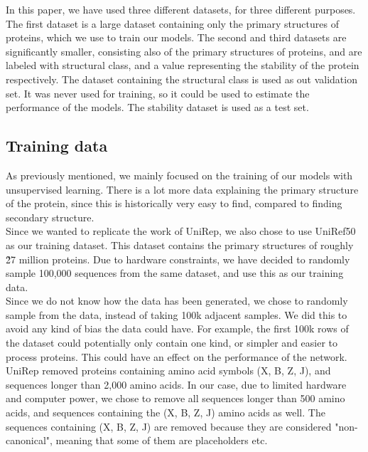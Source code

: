 In this paper, we have used three different datasets, for three different purposes. The first dataset is a large dataset containing only the primary structures of proteins, which we use to train our models. The second and third datasets are significantly smaller, consisting also of the primary structures of proteins, and are labeled with structural class, and a value representing the stability of the protein respectively. The dataset containing the structural class is used as out validation set. It was never used for training, so it could be used to estimate the performance of the models. The stability dataset is used as a test set.

\subsection{Training data}
As previously mentioned, we mainly focused on the training of our models with unsupervised learning. There is a lot more data explaining the primary structure of the protein, since this is historically very easy to find, compared to finding secondary structure. \\

\noindent
Since we wanted to replicate the work of UniRep, we also chose to use UniRef50 as our training dataset.\cite{uniref} This dataset contains the primary structures of roughly \~ 27 million proteins. Due to hardware constraints, we have decided to randomly sample 100,000 sequences from the same dataset, and use this as our training data. \\
Since we do not know how the data has been generated, we chose to randomly sample from the data, instead of taking 100k adjacent samples. We did this to avoid any kind of bias the data could have. For example, the first 100k rows of the dataset could potentially only contain one kind, or simpler and easier to process proteins. This could have an effect on the performance of the network.\\

\noindent
UniRep removed proteins containing amino acid symbols (X, B, Z, J), and sequences longer than 2,000 amino acids.\cite{unirep} In our case, due to limited hardware and computer power, we chose to remove all sequences longer than 500 amino acids, and sequences containing the (X, B, Z, J) amino acids as well. The sequences containing (X, B, Z, J) are removed because they are considered "non-canonical", meaning that some of them are placeholders etc.\\

